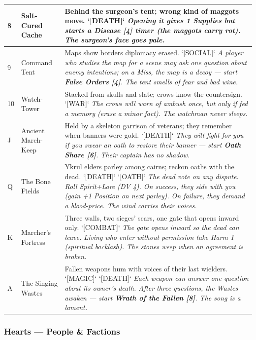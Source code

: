 \begin{longtable}{|p{}|p{}|p{}|}
\hline
8 & Salt-Cured Cache & Behind the surgeon's tent; wrong kind of maggots move. `[DEATH]` \textit{Opening it gives 1 \textbf{Supplies} but starts a \textbf{Disease [4]} timer (the maggots carry rot). The surgeon's face goes pale.} \\
\hline
9 & Command Tent & Maps show borders diplomacy erased. `[SOCIAL]` \textit{A player who studies the map for a scene may ask one question about enemy intentions; on a Miss, the map is a decoy --- start \textbf{False Orders [4]}. The tent smells of fear and bad wine.} \\
\hline
10 & Watch-Tower & Stacked from skulls and slate; crows know the countersign. `[WAR]` \textit{The crows will warn of ambush once, but only if fed a memory (erase a minor fact). The watchman never sleeps.} \\
\hline
J & Ancient March-Keep & Held by a skeleton garrison of veterans; they remember when banners were gold. `[DEATH]` \textit{They will fight for you if you swear an oath to restore their banner --- start \textbf{Oath Share [6]}. Their captain has no shadow.} \\
\hline
Q & The Bone Fields & Ykrul elders parley among cairns; reckon oaths with the dead. `[DEATH]` `[OATH]` \textit{The dead vote on any dispute. Roll Spirit+Lore (DV 4). On success, they side with you (gain +1 Position on next parley). On failure, they demand a blood-price. The wind carries their voices.} \\
\hline
K & Marcher's Fortress & Three walls, two sieges' scars, one gate that opens inward only. `[COMBAT]` \textit{The gate opens inward so the dead can leave. Living who enter without permission take Harm 1 (spiritual backlash). The stones weep when an agreement is broken.} \\
\hline
A & The Singing Wastes & Fallen weapons hum with voices of their last wielders. `[MAGIC]` `[DEATH]` \textit{Each weapon can answer one question about its owner's death. After three questions, the Wastes awaken --- start \textbf{Wrath of the Fallen [8]}. The song is a lament.} \\
\hline
\end{longtable}

\subsubsection*{Hearts --- People \& Factions}

